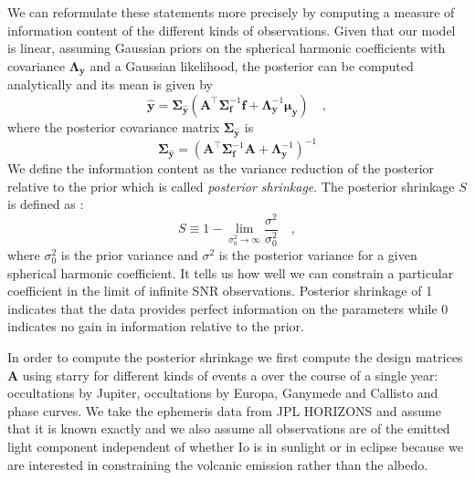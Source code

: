 \documentclass[modern]{aastex62}
\begin{document}
We can reformulate these statements more precisely by computing a measure of information content of the different kinds of observations.
Given that our model is linear, assuming Gaussian priors on the spherical harmonic coefficients with covariance $\boldsymbol{\Lambda}_\mathbf{y}$ and a Gaussian likelihood, the posterior can be computed analytically and its mean is given by
\begin{equation}
    \widehat{\mathbf{y}}=\boldsymbol{\Sigma}_{\hat{\mathbf{y}}}\left(\mathbf{A}^{\top} \boldsymbol{\Sigma}_{\mathbf{f}}^{-1} \mathbf{f}+\boldsymbol{\Lambda}_{\mathbf{y}}^{-1} \boldsymbol{\mu}_{\mathbf{y}}\right)
    \quad,
\end{equation}
where the posterior covariance matrix $\boldsymbol{\Sigma}_{\hat{\mathbf{y}}}$ is 
\begin{equation}
\boldsymbol{\Sigma}_{\hat{\mathbf{y}}}=\left( \mathbf{A}^{\top} \boldsymbol{\Sigma}_{\mathbf{f}}^{-1} \mathbf{A} +\boldsymbol{\Lambda}_{\mathbf{y}}^{-1}\right)^{-1}
\end{equation}
We define the information content as the variance reduction of the posterior relative to the prior which is called \emph{posterior shrinkage}.
The posterior shrinkage $S$ is defined as \citep{luger2021a,betancourt2018}:
\begin{equation}
S \equiv 1-\lim _{\sigma_{0}^{2} \rightarrow \infty} \frac{\sigma^{2}}{\sigma_{0}^{2}}
    \quad,
\end{equation}
where $\sigma^2_0$ is the prior variance and $\sigma^2$ is the posterior variance for a given spherical harmonic coefficient.
It tells us how well we can constrain a particular coefficient in the limit of infinite SNR observations.
Posterior shrinkage of 1 indicates that the data provides perfect information on the parameters while 0 indicates no gain in information relative to the prior.

In order to compute the posterior shrinkage we first compute the design matrices $\mathbf{A}$ using \textsf{starry} for different kinds of events a over the course of a single year: occultations by Jupiter, occultations by Europa, Ganymede and Callisto and phase curves.
We take the ephemeris data from \textsf{JPL HORIZONS} and assume that it is known exactly and we also assume all observations are of the emitted light component independent of whether Io is in sunlight or in eclipse because we are interested in constraining the volcanic emission rather than the albedo.
\end{document}
